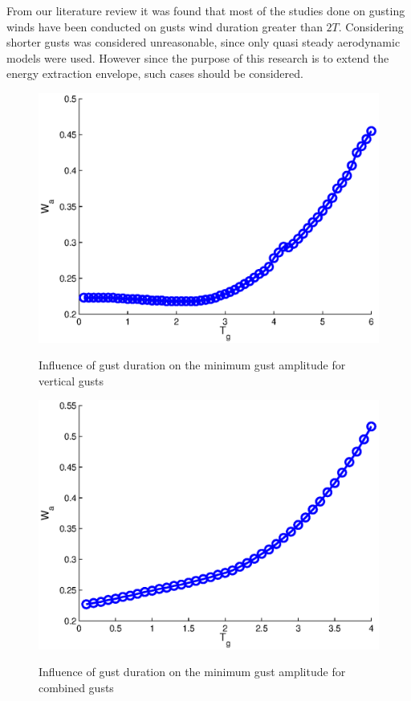 

From our literature review it was found that most of the studies done on gusting winds have been conducted on gusts wind duration greater than $2T$.
Considering shorter gusts was considered unreasonable, since only quasi steady aerodynamic models were used. 
However since the purpose of this research is to extend the energy extraction envelope, such cases should be considered.

\begin{figure}[h!]
  \begin{center}
    \scalebox{1.0}
    {\includegraphics{./Figures/Wg_vs_TG_windtype=1_alhpamax=12_nodalphalimit.eps}}
  \end{center}
  \caption{Influence of gust duration on the minimum gust amplitude for vertical gusts}
  \label{fig:vertical_amplitude_duration}
\end{figure}
\FloatBarrier
\begin{figure}[h!]
  \begin{center}
    \scalebox{1.0}
    {\includegraphics{./Figures/Wg_vs_TG_windtype=3_alhpamax=12_nodalphalimit.eps}}
  \end{center}
  \caption{Influence of gust duration on the minimum gust amplitude for combined gusts}
  \label{fig:combined_amplitude_duration}
\end{figure}

